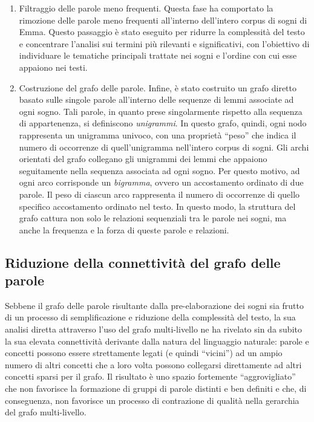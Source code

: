 \begin{enumerate}
    \item Filtraggio delle parole meno frequenti. \newline \noindent
          Questa fase ha comportato la rimozione delle parole meno frequenti all'interno dell'intero corpus di sogni
          di Emma. Questo passaggio è stato eseguito per ridurre la complessità del testo e concentrare l'analisi sui
          termini più rilevanti e significativi, con l'obiettivo di individuare le tematiche principali trattate
          nei sogni e l'ordine con cui esse appaiono nei testi.
    \item Costruzione del grafo delle parole. \newline \noindent
          Infine, è stato costruito un grafo diretto basato sulle singole parole all'interno delle sequenze
          di lemmi associate ad ogni sogno. Tali parole, in quanto prese singolarmente rispetto alla sequenza
          di appartenenza, si definiscono \textit{unigrammi}. In questo grafo, quindi, ogni nodo rappresenta
          un unigramma univoco, con una proprietà ``peso'' che indica il numero di occorrenze di quell'unigramma
          nell'intero corpus di sogni.
          Gli archi orientati del grafo collegano gli unigrammi dei lemmi che appaiono seguitamente nella
          sequenza associata ad ogni sogno. Per questo motivo, ad ogni arco corrisponde un \textit{bigramma}, ovvero
          un accostamento ordinato di due parole.
          Il peso di ciascun arco rappresenta il numero di occorrenze di quello specifico accostamento ordinato nel testo.
          In questo modo, la struttura del grafo cattura non solo le relazioni sequenziali tra le parole nei sogni,
          ma anche la frequenza e la forza di queste parole e relazioni.
\end{enumerate}


\subsection{Riduzione della connettività del grafo delle parole}\label{subsec:elaborazione-del-grafo-delle-parole}

Sebbene il grafo delle parole risultante dalla pre-elaborazione dei sogni sia frutto di un processo di
semplificazione e riduzione della complessità del testo, la sua analisi diretta attraverso l'uso del
grafo multi-livello ne ha rivelato sin da subito la sua elevata connettività derivante dalla natura del
linguaggio naturale: parole e concetti possono essere strettamente legati (e quindi ``vicini'') ad un ampio numero di
altri concetti che a loro volta possono collegarsi direttamente ad altri concetti sparsi per il grafo.
Il risultato è uno spazio fortemente ``aggrovigliato'' che non favorisce la formazione di gruppi di parole distinti e
ben definiti e che, di conseguenza, non favorisce un processo di contrazione di qualità nella
gerarchia del grafo multi-livello.

